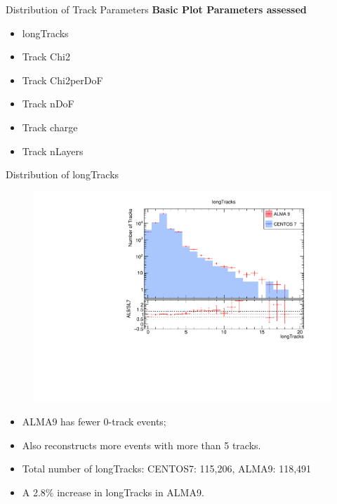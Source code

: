 \begin{frame}{Distribution of Track Parameters}
    \textbf{Basic Plot Parameters assessed}
    \begin{itemize}
        \item longTracks
        \item Track Chi2
        \item Track Chi2perDoF
        \item Track nDoF
        \item Track charge
        \item Track nLayers
    \end{itemize}
\end{frame}

\begin{frame}{Distribution of longTracks}    
    \begin{figure}        
        \includegraphics[width=0.8\linewidth]{output/longTracks.pdf}
    \end{figure}
    \vspace{-0.5cm}
    \begin{itemize}
        \item \small ALMA9 has fewer 0-track events;
        \item \small Also reconstructs more events with more than 5 tracks.
        \item \small Total number of longTracks: CENTOS7: 115,206, ALMA9: 118,491
        \item \small A 2.8\% increase in longTracks in ALMA9.
    \end{itemize}
\end{frame}


